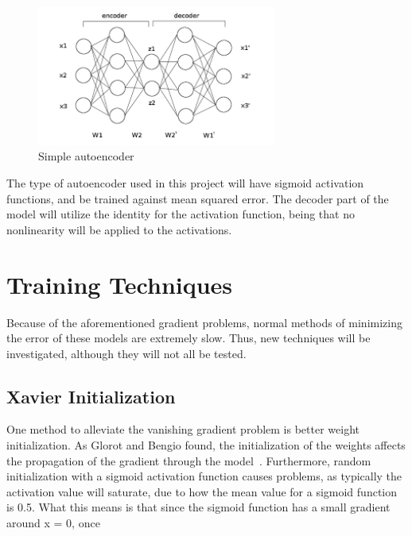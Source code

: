 \documentclass{article}
\begin{document}
\begin{figure}[H]
	\centering
	\caption{Simple autoencoder}
	\includegraphics[width=0.7\textwidth]{autoencoderDiagram.jpg}
\end{figure}

The type of autoencoder used in this project will have sigmoid activation
functions, and be trained against mean squared error. The decoder part of the
model will utilize the identity for the activation function, being that no
nonlinearity will be applied to the activations.

\section{Training Techniques}
Because of the aforementioned gradient problems, normal methods of minimizing
the error of these models are extremely slow. Thus, new techniques will be
investigated, although they will not all be tested.

\subsection{Xavier Initialization}
One method to alleviate the vanishing gradient problem is better weight
initialization. As Glorot and Bengio found, the initialization of the weights
affects the propagation of the gradient through the model~\cite{xavier}.
Furthermore, random initialization with a sigmoid activation function causes
problems, as typically the activation value will saturate, due to how the mean
value for a sigmoid function is 0.5. What this means is that since the sigmoid
function has a small gradient around x = 0, once
\end{document}
